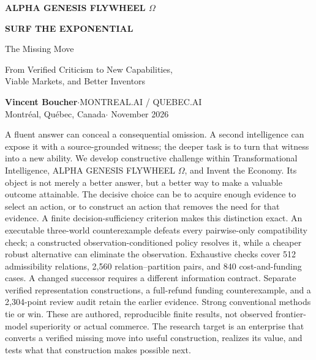\documentclass[11pt,letterpaper]{article}
\theoremstyle{remark}\newtheorem{remark}{Remark}[section]
\newcommand{\smallhead}[1]{\par\smallskip{\sffamily\bfseries\color{Gold}#1}\par\smallskip}
\begin{document}
\begin{titlepage}
\null
\end{titlepage}
\setcounter{page}{1}
\begin{center}
{\small\sffamily\bfseries\color{Gold}ALPHA GENESIS FLYWHEEL $\Omega$}\par\vspace{.12in}
{\LARGE\bfseries\color{Plum}SURF THE EXPONENTIAL}\par\vspace{.07in}
{\Large The Missing Move}\par\vspace{.1in}
{\large From Verified Criticism to New Capabilities,\\Viable Markets, and Better Inventors}\par\vspace{.16in}
\textbf{Vincent Boucher}\quad$\cdot$\quad MONTREAL.AI / QUEBEC.AI\\
{\small Montr\'{e}al, Qu\'{e}bec, Canada\quad$\cdot$ November 2026}
\end{center}
\smallhead{ABSTRACT}
A fluent answer can conceal a consequential omission. A second intelligence can expose it with a source-grounded witness; the deeper task is to turn that witness into a new ability. We develop constructive challenge within Transformational Intelligence, ALPHA GENESIS FLYWHEEL $\Omega$, and Invent the Economy. Its object is not merely a better answer, but a better way to make a valuable outcome attainable. The decisive choice can be to acquire enough evidence to select an action, or to construct an action that removes the need for that evidence. A finite decision-sufficiency criterion makes this distinction exact. An executable three-world counterexample defeats every pairwise-only compatibility check; a constructed observation-conditioned policy resolves it, while a cheaper robust alternative can eliminate the observation. Exhaustive checks cover 512 admissibility relations, 2,560 relation--partition pairs, and 840 cost-and-funding cases. A changed successor requires a different information contract. Separate verified representation constructions, a full-refund funding counterexample, and a 2,304-point review audit retain the earlier evidence. Strong conventional methods tie or win. These are authored, reproducible finite results, not observed frontier-model superiority or actual commerce. The research target is an enterprise that converts a verified missing move into useful construction, realizes its value, and tests what that construction makes possible next.
\end{document}
